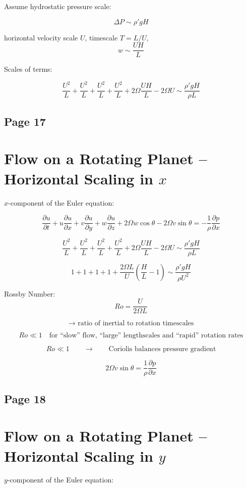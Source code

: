\documentclass[11pt]{article}
\begin{document}
Assume hydrostatic pressure scale:

\[
\Delta P \sim \rho' g H
\]

horizontal velocity scale $U$, timescale $T=L/U$,
\[
w \sim \frac{UH}{L}
\]

Scales of terms:

\[
\frac{U^2}{L}
+\frac{U^2}{L}
+\frac{U^2}{L}
+\frac{U^2}{L}
+2\Omega\frac{UH}{L}
-2\Omega U
\sim
\frac{\rho' g H}{\rho L}
\]

\subsection*{Page 17}
\section*{Flow on a Rotating Planet -- Horizontal Scaling in $x$}

$x$-component of the Euler equation:

\[
\frac{\partial u}{\partial t}
+u\frac{\partial u}{\partial x}
+v\frac{\partial u}{\partial y}
+w\frac{\partial u}{\partial z}
+2\Omega w\cos\theta
-2\Omega v\sin\theta
=
-\frac{1}{\rho}\frac{\partial p}{\partial x}
\]

\[
\frac{U^2}{L}
+\frac{U^2}{L}
+\frac{U^2}{L}
+\frac{U^2}{L}
+2\Omega\frac{UH}{L}
-2\Omega U
\sim
\frac{\rho' g H}{\rho L}
\]

\[
1+1+1+1
+
\frac{2\Omega L}{U}\left(\frac{H}{L}-1\right)
\sim
\frac{\rho' g H}{\rho U^2}
\]

Rossby Number:
\[
Ro=\frac{U}{2\Omega L}
\]

\[
\to \text{ ratio of inertial to rotation timescales}
\]

\[
Ro \ll 1
\quad
\text{for ``slow'' flow, ``large'' lengthscales and ``rapid'' rotation rates}
\]

\[
Ro \ll 1
\qquad\to\qquad
\text{Coriolis balances pressure gradient}
\]

\[
2\Omega v\sin\theta
=
\frac{1}{\rho}\frac{\partial p}{\partial x}
\]

\subsection*{Page 18}
\section*{Flow on a Rotating Planet -- Horizontal Scaling in $y$}

$y$-component of the Euler equation:
\end{document}
